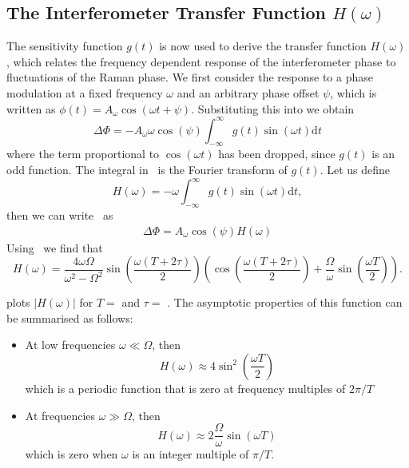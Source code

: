 \subsection{The Interferometer Transfer Function $H(\omega)$}\label{subsec:laser_phase}
The sensitivity function $g(t)$ is now used to derive the transfer
function $H(\omega)$, which relates the frequency dependent response of the interferometer phase to
fluctuations of the Raman phase. We first consider the response to a phase modulation at a
fixed frequency $\omega$ and an arbitrary phase offset $\psi$, which
is written as
\(\phi(t) = A_\omega\cos(\omega t + \psi)\). Substituting this into
 we obtain
\begin{equation}
  \Delta\Phi = - A_\omega \omega \cos(\psi) \int_{-\infty}^\infty g(t) \sin(\omega
  t) \mathrm{d} t
  \label{eq:phase_fourier}
\end{equation}
where the term proportional to \(\cos(\omega t)\) has been dropped,
since \(g(t)\) is an odd function. The integral
in~ is the Fourier
transform of \(g(t)\). Let us define
\begin{equation}
  H(\omega) = -\omega \int_{-\infty}^{\infty} g(t) \sin(\omega t)
  \mathrm{d} t,
  \label{eq:sensitvity_fourier}
\end{equation}
then we can write~ as
\begin{align}
  \Delta\Phi = A_\omega \cos(\psi) H(\omega)
  \label{eq:interfometer_fourier}
\end{align}
Using~
we find that~\nocite{Canuel2007}
\begin{equation}
  H(\omega) = \frac{4 \omega
  \Omega}{\omega^2-\Omega^2}\sin\left(\frac{\omega(T+2\tau)}{2}\right)\left(\cos\left(\frac{\omega(T+2\tau)}{2}\right)
  + \frac{\Omega}{\omega}\sin \left(\frac{\omega T}{2}\right)\right).
  \label{eq:sens_fourier_full}
\end{equation}
\par\noindent
{} plots $|H(\omega)|$ for
\(T= \)  and \(\tau
= \) . 
The asymptotic properties of this
function can be summarised as follows:
\begin{itemize}
  \item At low frequencies \(\omega \ll \Omega\), then 
    \begin{equation}
      H(\omega) \approx 4 \sin^2 \left(\frac{\omega T}{2}\right)
    \end{equation}
    which is a periodic function that is zero at frequency multiples
    of \(2\pi/T\) \\
  \item At frequencies \(\omega \gg \Omega\), then
    \begin{equation}
      H(\omega) \approx 2 \frac{\Omega}{\omega}\sin
      \left(\omega T\right)
    \end{equation}
    which is zero when $\omega$ is an integer multiple of $\pi/T$.
\end{itemize}
